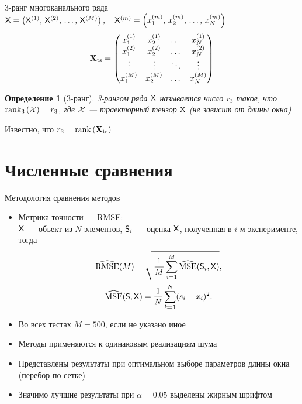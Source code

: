 \documentclass[pdf, unicode, 10pt, notheorems, handout]{beamer}
\newcommand{\rank}{\operatorname{rank}}
\newtheorem{definition}{Определение}
\begin{document}
\begin{frame}{3-ранг многоканального ряда}
  $\mathsf{X} = \left(\mathsf{X}^{(1)},\, \mathsf{X}^{(2)}, \, \ldots,\,
  \mathsf{X}^{(M)}\right),\quad\mathsf{X}^{(m)} = \left(x_1^{(m)}, \, x_2^{(m)},\,\ldots,\,
  x_N^{(m)}\right)$
  \[
    \mathbf{X}_{\mathrm{ts}} =
    \begin{pmatrix}
      x_1^{(1)} & x_2^{(1)} & \dots & x_N^{(1)}\\
      x_1^{(2)} & x_2^{(2)} & \dots & x_N^{(2)}\\
      \vdots & \vdots & \ddots & \vdots\\
      x_1^{(M)} & x_2^{(M)} & \dots & x_N^{(M)}
    \end{pmatrix}
  \]

  \begin{definition}[3-ранг]
    3-рангом ряда $\mathsf{X}$ называется число $r_3$ такое, что
    $\rank_3\left(\calX\right) = r_3$, где $\mathcal{X}$ --- траекторный
    тензор $\mathsf{X}$ (не зависит от длины окна)
  \end{definition}

  \medskip

  Известно, что $r_3 = \rank\left(\bfX_{\mathrm{ts}}\right)$
\end{frame}

\section{Численные сравнения}
\begin{frame}{Методология сравнения методов}
  \begin{itemize}
    \item Метрика точности --- \textrm{RMSE}:\\
      $\mathsf{X}$ --- объект из $N$ элементов, $\mathsf{S}_i$ --- оценка $\mathsf{X}$,
      полученная в $i$-м эксперименте, тогда
      \begin{gather*}
        \widehat{\operatorname{RMSE}}(M)=\sqrt{\frac{1}{M}
        \sum_{i=1}^{M} \widehat{\operatorname{MSE}}(\mathsf{S}_i, \mathsf{X})},\\
        \widehat{\operatorname{MSE}}(\mathsf{S}, \mathsf{X})=\frac 1 N
        \sum_{k=1}^{N} (s_i-x_i)^2.
      \end{gather*}

    \item Во всех тестах $M = 500$, если не указано иное
    \item Методы применяются к одинаковым реализациям шума
    \item Представлены результаты при оптимальном выборе параметров
      длины окна (перебор по сетке)
    \item Значимо лучшие результаты при $\alpha=0.05$ выделены жирным шрифтом
  \end{itemize}
\end{frame}
\end{document}
